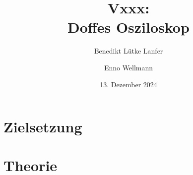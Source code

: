 

\title{Vxxx:\\ Doffes Osziloskop}
\author{Benedikt Lütke Lanfer \and Enno Wellmann}
\date{13. Dezember 2024}
\publishers{TU Dortmund – Fakultät Physik}



\tableofcontents
\newpage

\section{Zielsetzung}


\section{Theorie}









